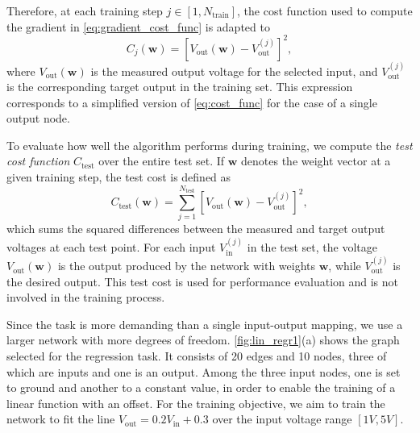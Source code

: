 \documentclass[reprint,superscriptaddress,prb,showkeys]{revtex4-2}
\begin{document}
Therefore, at each training step $ j \in[1, N_{\text{train}}] $, the cost function used to compute the gradient in \cref{eq:gradient_cost_func} is adapted to
\[
C_j(\boldsymbol{w}) = \left[ V_{\text{out}}(\boldsymbol{w}) - V_{\text{out}}^{(j)} \right]^2,
\]
where $ V_{\text{out}}(\boldsymbol{w}) $ is the measured output voltage for the selected input, and $ V_{\text{out}}^{(j)} $ is the corresponding target output in the training set. This expression corresponds to a simplified version of \cref{eq:cost_func} for the case of a single output node.

To evaluate how well the algorithm performs during training, we compute the \emph{test cost function} $ C_{\text{test}} $ over the entire test set. If $ \boldsymbol{w} $ denotes the weight vector at a given training step, the test cost is defined as
\[
C_{\text{test}}\left( \boldsymbol{w} \right) = \sum_{j=1}^{N_{\text{test}}} \left[ V_{\text{out}}(\boldsymbol{w}) - V_{\text{out}}^{(j)} \right]^2,
\]
which sums the squared differences between the measured and target output voltages at each test point. For each input $V_{\text{in}}^{(j)}$ in the test set, the voltage $ V_{\text{out}}(\boldsymbol{w}) $ is the output produced by the network with weights $ \boldsymbol{w} $, while $ V_{\text{out}}^{(j)} $ is the desired output. This test cost is used for performance evaluation and is not involved in the training process.

Since the task is more demanding than a single input-output mapping, we use a larger network with more degrees of freedom. \cref{fig:lin_regr1}(a) shows the graph selected for the regression task. It consists of 20 edges and 10 nodes, three of which are inputs and one is an output. Among the three input nodes, one is set to ground and another to a constant value, in order to enable the training of a linear function with an offset. For the training objective, we aim to train the network to fit the line $V_{\text{out}} = 0.2 V_{\text{in}} + 0.3$ over the input voltage range $[1V, 5V]$.
\end{document}
